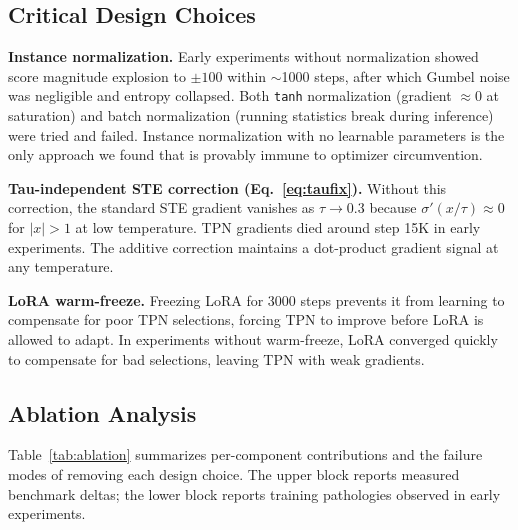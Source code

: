 \documentclass{article}
\begin{document}
\subsection{Critical Design Choices}

\textbf{Instance normalization.}
Early experiments without normalization showed score magnitude explosion to $\pm100$
within $\sim$1000 steps, after which Gumbel noise was negligible and entropy collapsed.
Both \texttt{tanh} normalization (gradient $\approx 0$ at saturation) and batch
normalization (running statistics break during inference) were tried and failed.
Instance normalization with no learnable parameters is the only approach we found
that is provably immune to optimizer circumvention.

\textbf{Tau-independent STE correction (Eq.~\ref{eq:taufix}).}
Without this correction, the standard STE gradient vanishes as $\tau \to 0.3$ because
$\sigma'(x/\tau) \approx 0$ for $|x| > 1$ at low temperature.
TPN gradients died around step 15K in early experiments.
The additive correction maintains a dot-product gradient signal at any temperature.

\textbf{LoRA warm-freeze.}
Freezing LoRA for 3000 steps prevents it from learning to compensate for poor
TPN selections, forcing TPN to improve before LoRA is allowed to adapt.
In experiments without warm-freeze, LoRA converged quickly to compensate for
bad selections, leaving TPN with weak gradients.

\subsection{Ablation Analysis}

Table~\ref{tab:ablation} summarizes per-component contributions and the
failure modes of removing each design choice.
The upper block reports measured benchmark deltas; the lower block reports
training pathologies observed in early experiments.
\end{document}
